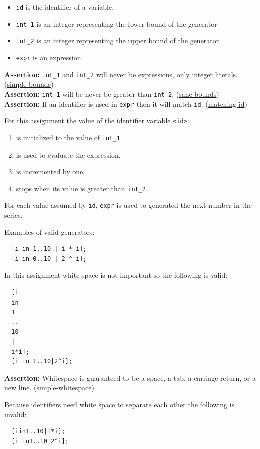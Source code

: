 \documentclass{article}
\newcommand{\code}[1]{\texttt{\textmd{#1}}}
\newcommand{\assertion}[2]{\textbf{Assertion: }#1 (\hyperlink{#2}{#2})}
\begin{document}
\begin{itemize}
  \item \code{id} is the identifier of a variable.
  \item{\code{int\_1}} is an integer representing the lower bound of the generator
  \item{\code{int\_2}} is an integer representing the upper bound of the generator
  \item{\code{expr}} is an expression
\end{itemize}

\assertion{\code{int\_1} and \code{int\_2} will never be expressions, only integer literals.}
{simple-bounds} \\
\assertion{\code{int\_1} will be never be greater than \code{int\_2}.}{sane-bounds}\\
\assertion{If an identifier is used in \code{expr} then it will match \code{id}.}{matching-id}

For this assignment the value of the identifier variable \code{<id>}:
\begin{enumerate}
  \item is initialized to the value of \code{int\_1}.
  \item is used to evaluate the expression.
  \item is incremented by one.
  \item stops when its value is greater than \code{int\_2}.
\end{enumerate}
For each value assumed by \code{id}, \code{expr} is used to generated the next number in the
series.

Examples of valid generators:
\begin{lstlisting}
  [i in 1..10 | i * i];
  [i in 0..10 | 2 ^ i];
\end{lstlisting}

In this assignment white space is not important so the following is valid:

\begin{lstlisting}
  [i
  in
  1
  ..
  10
  |
  i*i];
  [i in 1..10|2^i];
\end{lstlisting}

\assertion{Whitespace is guaranteed to be a space, a tab, a carriage return, or a new
line.}{simple-whitespace}

Because identifiers need white space to separate each other the following is invalid:
\begin{lstlisting}
  [iin1..10|i*i];
  [i in1..10|2^i];
\end{lstlisting}
\end{document}

